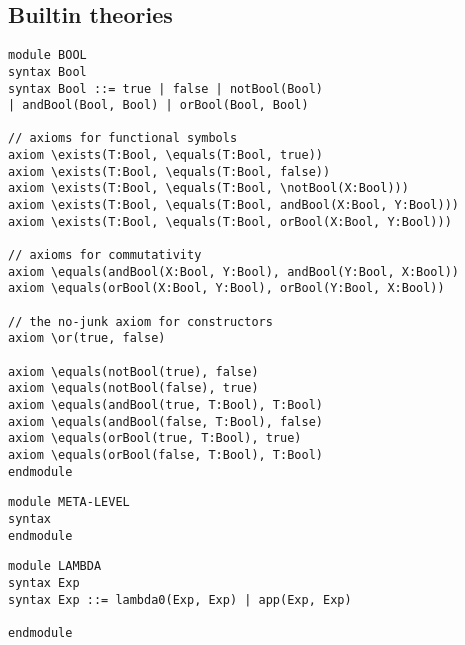 \documentclass[UTF8]{article}
\theoremstyle{plain}
\theoremstyle{definition}
\theoremstyle{remark}
\begin{document}
\subsection{Builtin theories}

\begin{Verbatim}
module BOOL
syntax Bool
syntax Bool ::= true | false | notBool(Bool)
| andBool(Bool, Bool) | orBool(Bool, Bool)

// axioms for functional symbols
axiom \exists(T:Bool, \equals(T:Bool, true))
axiom \exists(T:Bool, \equals(T:Bool, false))
axiom \exists(T:Bool, \equals(T:Bool, \notBool(X:Bool)))
axiom \exists(T:Bool, \equals(T:Bool, andBool(X:Bool, Y:Bool)))
axiom \exists(T:Bool, \equals(T:Bool, orBool(X:Bool, Y:Bool)))

// axioms for commutativity
axiom \equals(andBool(X:Bool, Y:Bool), andBool(Y:Bool, X:Bool))
axiom \equals(orBool(X:Bool, Y:Bool), orBool(Y:Bool, X:Bool))

// the no-junk axiom for constructors
axiom \or(true, false)

axiom \equals(notBool(true), false)
axiom \equals(notBool(false), true)
axiom \equals(andBool(true, T:Bool), T:Bool)
axiom \equals(andBool(false, T:Bool), false)
axiom \equals(orBool(true, T:Bool), true)
axiom \equals(orBool(false, T:Bool), T:Bool)
endmodule
\end{Verbatim}

\begin{Verbatim}
module META-LEVEL
syntax 
endmodule
\end{Verbatim}

\begin{Verbatim}
module LAMBDA
syntax Exp
syntax Exp ::= lambda0(Exp, Exp) | app(Exp, Exp)

endmodule
\end{Verbatim}
\end{document}
